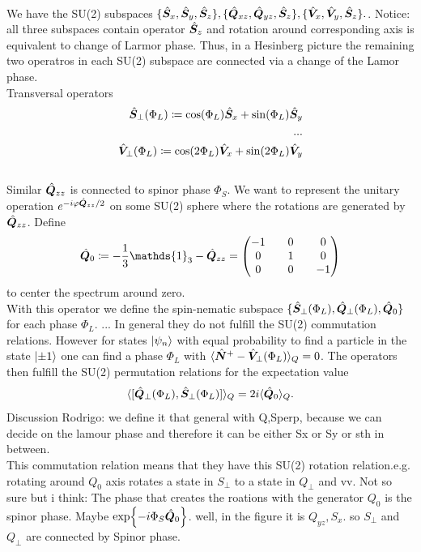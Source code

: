 \\
We have the SU(2) subspaces $\{\hat{\bm{S}}_x, \hat{\bm{S}}_y, \hat{\bm{S}}_z\}, \{\hat{\bm{Q}}_{xz},\hat{\bm{Q}}_{yz}, \hat{\bm{S}}_z\}, \{\hat{\bm{V}}_x, \hat{\bm{V}}_y, \hat{\bm{S}}_z\}.$. Notice: all three subspaces contain operator $\hat{\bm{S}}_z$ and rotation around corresponding axis is equivalent to change of Larmor phase. Thus, in a Hesinberg picture the remaining two operatros in each SU(2) subspace are connected via a change of the Lamor phase. 
\\
Transversal operators
\begin{align}
	\hat{\bm{S}}_\perp (\Phi_L) \coloneqq \cos(\Phi_L) \hat{\bm{S}}_x + \sin(\Phi_L) \hat{\bm{S}}_y
	\\
	...
	\\
	\hat{\bm{V}}_\perp (\Phi_L) \coloneqq \cos(2\Phi_L) \hat{\bm{V}}_x + \sin(2\Phi_L) \hat{\bm{V}}_y
\end{align}
\\
Similar $\hat{\bm{Q}}_{zz}$ is connected to spinor phase $\Phi_S$. We want to represent the unitary operation $e^{-i \varphi \hat{\bm{Q}}_{zz}/2}$ on some SU(2) sphere where the rotations are generated by $\hat{\bm{Q}}_{zz}$. Define 
\begin{equation}
	\xo{Q}_0 \coloneqq - \frac{1}{3} \mathds{1}_3 - \xo{Q}_{zz} = \left(
	\begin{matrix}
		-1 && 0 && 0 
		\\
		0 && 1 && 0 
		\\ 
		0 && 0 && -1
	\end{matrix}
	\right)
\end{equation} 
to center the spectrum around zero. 
\\
With this operator we define the spin-nematic subspace $\{\hat{\bm{S}}_\perp(\Phi_L), \hat{\bm{Q}}_\perp(\Phi_L), \hat{\bm{Q}}_0\}$ for each phase $\Phi_L$. ... In general they do not fulfill the SU(2) commutation relations. However for states $\ket{\psi_n}$ with equal probability to find a particle in the state $\ket{\pm 1}$ one can find a phase $\Phi_L$  with $\langle \hat{\bm{N}}^+ - \hat{\bm{V}}_\perp(\Phi_L)\rangle_Q = 0$. The operators then fulfill the SU(2) permutation relations for the expectation value
\begin{equation}
	\langle [ \hat{\bm{Q}}_\perp (\Phi_L), \hat{\bm{S}}_\perp (\Phi_L) ] \rangle_Q = 2 i \langle \hat{\bm{Q}}_0 \rangle_Q.
\end{equation}
Discussion Rodrigo: we define it that general with Q,Sperp, because we can decide on the lamour phase and therefore it can be either Sx or Sy or sth in between.
\\
This commutation relation means that they have this SU(2) rotation relation.e.g. rotating around $Q_0$ axis rotates a state in $S_\perp$ to a state in $Q_\perp$ and vv. Not so sure but i think: The phase that creates the roations with the generator $Q_0$ is the spinor phase. Maybe $\exp{-i \Phi_S \hat{\bm{Q}}_0}$. well, in the figure it is $Q_{yz}, S_x$. so $S_\perp$ and $Q_\perp$ are connected by Spinor phase.
